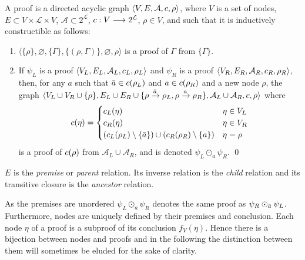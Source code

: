 \documentclass{llncs}
\begin{document}
\begin{definition}[Proof] \label{def:proof}
A proof is a directed acyclic graph
$\langle 
V, 
E, 
\mathcal{A},
c, 
\rho
\rangle$, 
where $V$ is a set of nodes, $E \subset V \times \mathcal{L} \times V$, 
$\mathcal{A} \subset 2^\mathcal{L}$,
$c : V \longrightarrow 2^\mathcal{L}$, 
$\rho \in V$, and such that it is inductively constructible as follows:
\begin{enumerate}
  \item $\langle \{\rho\}, \varnothing, \{ \Gamma \}, \{ (\rho, \Gamma) \}, \varnothing,  \rho \rangle$ 
    is a proof of $\Gamma$ from $\{ \Gamma \}$.
  \item If $\psi_L$ is a proof $\langle V_L, E_L, \mathcal{A}_L, c_L, \rho_L \rangle$ and
    $\psi_R$ is a proof $\langle V_R, E_R, \mathcal{A}_R, c_R, \rho_R \rangle$, then, for any $a$ such that $\bar{a} \in c(\rho_L)$ and $a
    \in c(\rho_R)$ and a new node $\rho$, the graph 
    $\langle 
    V_L \cup V_R \cup \{\rho\},
    E_L \cup E_R \cup \{\rho \xrightarrow{\bar{a}} \rho_L, \rho \xrightarrow{a} \rho_R\}, 
    \mathcal{A}_L \cup \mathcal{A}_R,
    c,
    \rho
    \rangle$ where
    \begin{equation*}
      c(\eta) = \begin{cases}
        c_L(\eta) & \eta \in V_L \\
        c_R(\eta) & \eta \in V_R \\
        (c_L(\rho_L) \setminus \{\bar{a}\}) \cup (c_R(\rho_R) \setminus \{a\}) &
          \eta = \rho
      \end{cases}
    \end{equation*}
    is a proof of $c(\rho)$ from $\mathcal{A}_L \cup \mathcal{A}_R$, and is denoted $\psi_L \odot_a \psi_R$.
  \qed
\end{enumerate}
\end{definition}


 $E$ is the \emph{premise} or \emph{parent} relation. Its inverse relation is the \emph{child} relation and its
transitive closure is the \emph{ancestor} relation.  

As the premises are unordered $\psi_L \odot_a \psi_R$ denotes the same proof as $\psi_R
\odot_{\bar{a}} \psi_L$.  Furthermore, nodes are uniquely defined by their premises and conclusion.
Each node $\eta$ of a proof is a subproof of its conclusion $f_V(\eta)$.  Hence there is a bijection
between nodes and proofs and in the following the distinction between them will sometimes be eluded
for the sake of clarity.
\end{document}
